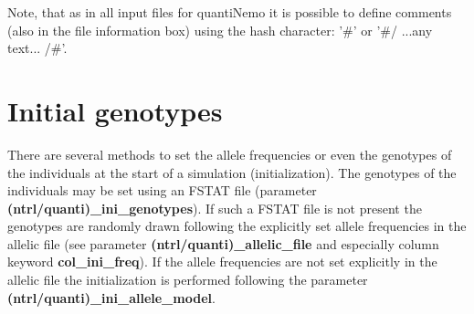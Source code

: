 \documentclass[letterpaper,12pt,oneside]{book}
\begin{document}
\begin{description}
\begin{description}
\end{description} 
Note, that as in all input files for quantiNemo it is possible to define comments (also in the file information box) using the hash character: '\#' or '\#/ ...any text... /\#'.
\end{description}


\section{Initial genotypes}\label{sec:InitialGenotypes}
There are several methods to set the allele frequencies or even the genotypes of the individuals at the start of a simulation (initialization). The genotypes of the individuals may be set using an FSTAT file \citep{Goudet_1995} (parameter \textbf{(ntrl/quanti)\_ini\_genotypes}). If such a FSTAT file is not present the genotypes are randomly drawn following the explicitly set allele frequencies in the allelic file (see parameter \textbf{(ntrl/quanti)\_allelic\_file} and especially column keyword \textbf{col\_ini\_freq}). If the allele frequencies are not set explicitly in the allelic file the initialization is performed following the parameter \textbf{(ntrl/quanti)\_ini\_allele\_model}.  
\end{document}
